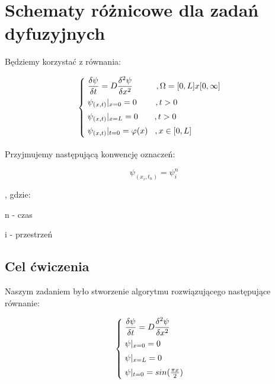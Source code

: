 \section{Schematy różnicowe dla zadań dyfuzyjnych}

Będziemy korzystać z równania:

\[
\begin{cases}
\vspace{0.1cm} 
\hspace{0,1cm} \dfrac{\delta \psi}{\delta t} = D\dfrac{\delta^2 \psi}{\delta x^2} \hspace{1cm}, \Omega = [0,L]x[0,\infty] \\
\vspace{0.1cm}
\hspace{0,1cm}\psi_{(x,t)}|_{x=0} = 0 \hspace{0.8cm},t>0 \\
\vspace{0.1cm} 
\hspace{0,1cm}\psi_{(x,t)}|_{x=L} = 0 \hspace{0.7cm},t>0 \\
\vspace{0.1cm} 
\hspace{0,1cm}\psi_{(x,t)}|_{t=0} = \varphi(x) \hspace{0.3cm},x\in[0,L]
\end{cases}
\]

Przyjmujemy następującą konwencję oznaczeń:

\fontsize{14}{2}

$$\psi_{(x_i,t_n)} = \psi^{n}_{i}$$

\fontsize{11}{1}

, gdzie:

n - czas

i - przestrzeń

\subsection{Cel ćwiczenia}

Naszym zadaniem było stworzenie algorytmu rozwiązującego następujące równanie:

\[
\begin{cases}
\vspace{0.1cm} 
\hspace{0,1cm} \dfrac{\delta \psi}{\delta t} = D\dfrac{\delta^2 \psi}{\delta x^2} \\
\vspace{0.1cm}
\hspace{0,1cm}\psi|_{x=0} = 0 \\
\vspace{0.1cm} 
\hspace{0,1cm}\psi|_{x=L} = 0 \\
\vspace{0.1cm} 
\hspace{0,1cm}\psi|_{t=0} = sin(\frac{\pi x}{2})
\end{cases}
\]

